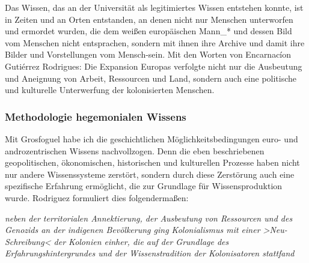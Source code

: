 Das Wissen, das an der Universität als legitimiertes Wissen entstehen konnte,
ist in Zeiten und an Orten entstanden, an denen nicht nur Menschen unterworfen
und ermordet wurden, die dem weißen europäischen Mann\_* und dessen Bild vom
Menschen nicht entsprachen, sondern mit ihnen ihre Archive und damit ihre
Bilder und Vorstellungen vom Mensch-sein. Mit den Worten von Encarnacíon
Gutiérrez Rodrigues: \glqq Die Expansion Europas verfolgte nicht nur die Ausbeutung
und Aneignung von Arbeit, Ressourcen und Land, sondern auch eine politische und
kulturelle Unterwerfung der kolonisierten Menschen. \grqq \footnotemark
{}
\subsubsection{Methodologie hegemonialen Wissens}
Mit Grosfoguel habe ich die geschichtlichen Möglichkeitsbedingungen euro- und androzentrischen Wissens nachvollzogen. Denn die eben beschriebenen geopolitischen, ökonomischen, historischen und kulturellen Prozesse haben nicht nur andere Wissenssysteme zerstört, sondern durch diese Zerstörung auch eine spezifische Erfahrung ermöglicht, die zur Grundlage für Wissensproduktion wurde. Rodriguez formuliert dies folgendermaßen:
\begin{myenv}
  \textit{
  \glqq
[....] neben der territorialen Annektierung, der Ausbeutung von Ressourcen und des Genozids an der indigenen Bevölkerung ging Kolonialismus mit einer >Neu-Schreibung< der Kolonien einher, die auf der Grundlage des Erfahrungshintergrundes und der Wissenstradition der Kolonisatoren stattfand
\grqq } \footnotemark {}
\end{myenv}

